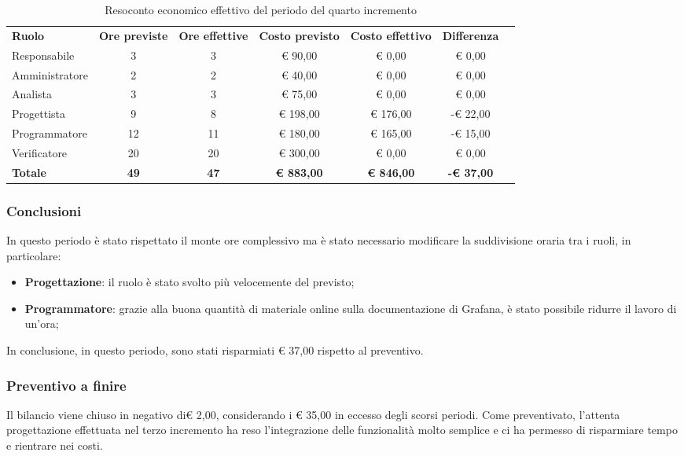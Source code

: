 \documentclass[../piano-di-progetto.tex]{subfiles}
\begin{document}
  \begin{table}[H]
    \centering
    \begin{tabular}{lcccccc}
      \rowcolor{lightgray}
      \textbf{Ruolo}  & \textbf{Ore previste} & \textbf{Ore effettive} & \textbf{Costo previsto} & \textbf{Costo effettivo} & \textbf{Differenza} \\
Responsabile    & 3           & 3           & € 90,00           & € 0,00            & € 0,00            \\
Amministratore  & 2           & 2           & € 40,00           & € 0,00            & € 0,00            \\
Analista        & 3           & 3           & € 75,00           & € 0,00            & € 0,00            \\
Progettista     & 9           & 8           & € 198,00          & € 176,00          & -€ 22,00          \\
Programmatore   & 12          & 11          & € 180,00          & € 165,00          & -€ 15,00          \\
Verificatore    & 20          & 20          & € 300,00          & € 0,00            & € 0,00            \\
\textbf{Totale} & \textbf{49} & \textbf{47} & \textbf{€ 883,00} & \textbf{€ 846,00} & \textbf{-€ 37,00}

    \end{tabular}
    \caption{Resoconto economico effettivo del periodo del quarto incremento}
  \end{table}


\subsubsection{Conclusioni}
In questo periodo è stato rispettato il monte ore complessivo ma è stato necessario modificare la suddivisione oraria tra i ruoli, in particolare:
\begin{itemize}
    \item \textbf{Progettazione}: il ruolo è stato svolto più velocemente del previsto;
    \item \textbf{Programmatore}: grazie alla buona quantità di materiale online sulla documentazione di Grafana, è stato possibile ridurre il lavoro di un'ora;
\end{itemize}
In conclusione, in questo periodo, sono stati risparmiati € 37,00 rispetto al preventivo.

\subsubsection{Preventivo a finire}
Il bilancio viene chiuso in negativo di€ 2,00, considerando i € 35,00 in eccesso degli scorsi periodi. Come preventivato, l'attenta progettazione effettuata nel terzo incremento ha reso l'integrazione delle funzionalità molto semplice e ci ha permesso di risparmiare tempo e rientrare nei costi. 
\end{document}
